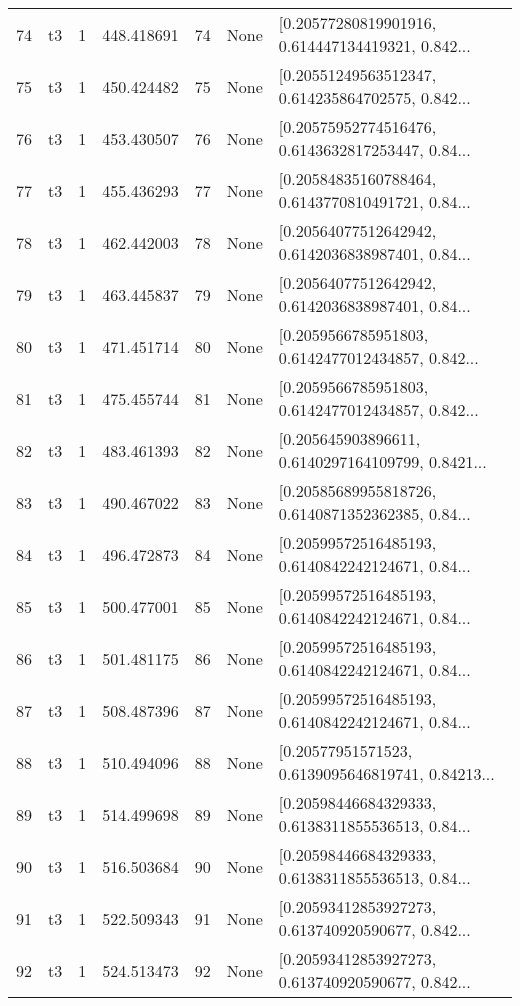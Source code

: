 \begin{tabular}{lllrlll}
74  &  t3 &   1 &  448.418691 &   74 &  None &  [0.20577280819901916, 0.614447134419321, 0.842... \\
75  &  t3 &   1 &  450.424482 &   75 &  None &  [0.20551249563512347, 0.614235864702575, 0.842... \\
76  &  t3 &   1 &  453.430507 &   76 &  None &  [0.20575952774516476, 0.6143632817253447, 0.84... \\
77  &  t3 &   1 &  455.436293 &   77 &  None &  [0.20584835160788464, 0.6143770810491721, 0.84... \\
78  &  t3 &   1 &  462.442003 &   78 &  None &  [0.20564077512642942, 0.6142036838987401, 0.84... \\
79  &  t3 &   1 &  463.445837 &   79 &  None &  [0.20564077512642942, 0.6142036838987401, 0.84... \\
80  &  t3 &   1 &  471.451714 &   80 &  None &  [0.2059566785951803, 0.6142477012434857, 0.842... \\
81  &  t3 &   1 &  475.455744 &   81 &  None &  [0.2059566785951803, 0.6142477012434857, 0.842... \\
82  &  t3 &   1 &  483.461393 &   82 &  None &  [0.205645903896611, 0.6140297164109799, 0.8421... \\
83  &  t3 &   1 &  490.467022 &   83 &  None &  [0.20585689955818726, 0.6140871352362385, 0.84... \\
84  &  t3 &   1 &  496.472873 &   84 &  None &  [0.20599572516485193, 0.6140842242124671, 0.84... \\
85  &  t3 &   1 &  500.477001 &   85 &  None &  [0.20599572516485193, 0.6140842242124671, 0.84... \\
86  &  t3 &   1 &  501.481175 &   86 &  None &  [0.20599572516485193, 0.6140842242124671, 0.84... \\
87  &  t3 &   1 &  508.487396 &   87 &  None &  [0.20599572516485193, 0.6140842242124671, 0.84... \\
88  &  t3 &   1 &  510.494096 &   88 &  None &  [0.20577951571523, 0.6139095646819741, 0.84213... \\
89  &  t3 &   1 &  514.499698 &   89 &  None &  [0.20598446684329333, 0.6138311855536513, 0.84... \\
90  &  t3 &   1 &  516.503684 &   90 &  None &  [0.20598446684329333, 0.6138311855536513, 0.84... \\
91  &  t3 &   1 &  522.509343 &   91 &  None &  [0.20593412853927273, 0.613740920590677, 0.842... \\
92  &  t3 &   1 &  524.513473 &   92 &  None &  [0.20593412853927273, 0.613740920590677, 0.842... \\

\end{tabular}
